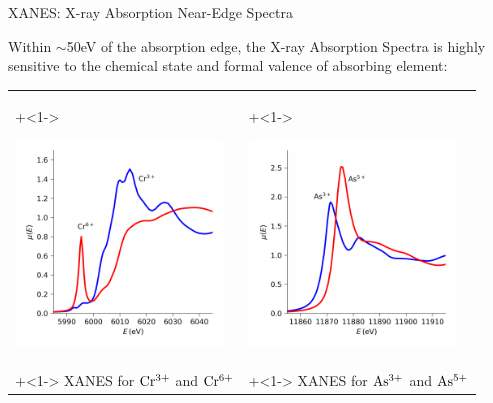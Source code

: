 \begin{slide}{XANES:  X-ray Absorption Near-Edge Spectra}

 Within $\sim$50eV of the absorption edge, the X-ray Absorption Spectra is
 highly sensitive to the chemical state and formal valence of absorbing element:

  \vmm
  \begin{tabular}{ll}
    \onslide+<1->
    \begin{minipage}{55mm}
      \includegraphics[width=55mm]{figs/xanes/cr}
    \end{minipage}
    &
    \onslide+<1->
    \begin{minipage}{55mm}
      \includegraphics[width=55mm]{figs/xanes/as}
    \end{minipage} \\
    \onslide+<1->
    \hspace{5mm} XANES for $\rm Cr^{3+}$ and $\rm Cr^{6+}$
    &
    \onslide+<1->
    \hspace{5mm}   XANES for $\rm As^{3+}$ and $\rm As^{5+}$
  \end{tabular}

  \begin{center}
    \begin{postitbox}{105mm}
        {}
    \end{postitbox}
  \end{center}

\vfill
\end{slide}
